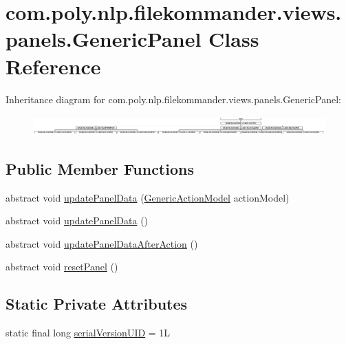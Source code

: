 \hypertarget{classcom_1_1poly_1_1nlp_1_1filekommander_1_1views_1_1panels_1_1_generic_panel}{\section{com.\-poly.\-nlp.\-filekommander.\-views.\-panels.\-Generic\-Panel Class Reference}
\label{classcom_1_1poly_1_1nlp_1_1filekommander_1_1views_1_1panels_1_1_generic_panel}
}
Inheritance diagram for com.\-poly.\-nlp.\-filekommander.\-views.\-panels.\-Generic\-Panel\-:\begin{figure}[H]
\begin{center}
\leavevmode
\includegraphics[height=0.758294cm]{classcom_1_1poly_1_1nlp_1_1filekommander_1_1views_1_1panels_1_1_generic_panel}
\end{center}
\end{figure}
\subsection*{Public Member Functions}
\begin{DoxyCompactItemize}
\item 
abstract void \hyperlink{classcom_1_1poly_1_1nlp_1_1filekommander_1_1views_1_1panels_1_1_generic_panel_aec26b991510d51ae77eb19bf6e7855f7}{update\-Panel\-Data} (\hyperlink{interfacecom_1_1poly_1_1nlp_1_1filekommander_1_1views_1_1models_1_1_generic_action_model}{Generic\-Action\-Model} action\-Model)
\item 
abstract void \hyperlink{classcom_1_1poly_1_1nlp_1_1filekommander_1_1views_1_1panels_1_1_generic_panel_aa001c8d88eccb61c64ad0d3b0d296648}{update\-Panel\-Data} ()
\item 
abstract void \hyperlink{classcom_1_1poly_1_1nlp_1_1filekommander_1_1views_1_1panels_1_1_generic_panel_aacbeeee52c7652d69d95879cb713936d}{update\-Panel\-Data\-After\-Action} ()
\item 
abstract void \hyperlink{classcom_1_1poly_1_1nlp_1_1filekommander_1_1views_1_1panels_1_1_generic_panel_ae70ee89c98b042bbe57cb45e9a79816f}{reset\-Panel} ()
\end{DoxyCompactItemize}
\subsection*{Static Private Attributes}
\begin{DoxyCompactItemize}
\item 
static final long \hyperlink{classcom_1_1poly_1_1nlp_1_1filekommander_1_1views_1_1panels_1_1_generic_panel_ac3f7f05bbdfeb29c6d8dd1eebfbda726}{serial\-Version\-U\-I\-D} = 1\-L
\end{DoxyCompactItemize}



